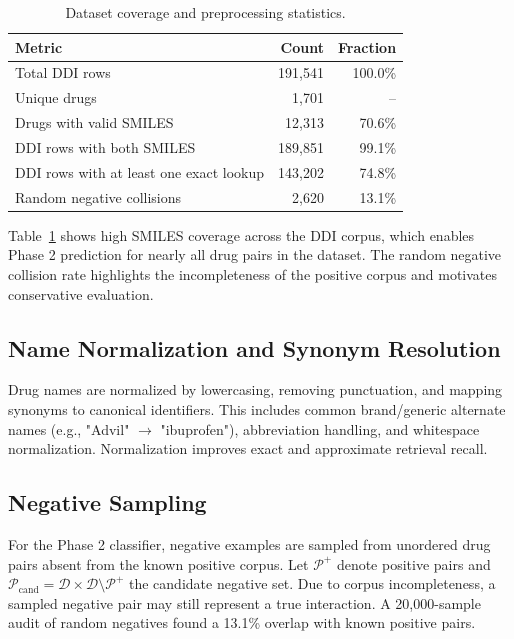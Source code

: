 \documentclass[conference]{IEEEtran}
\begin{document}
\begin{table}[t]
    \centering
    \caption{Dataset coverage and preprocessing statistics.}
    \label{tab:coverage}
    \begin{tabular}{@{}lrr@{}}
    \toprule
    Metric & Count & Fraction \\
    \midrule
    Total DDI rows & 191,541 & 100.0\% \\
    Unique drugs & 1,701 & -- \\
    Drugs with valid SMILES & 12,313 & 70.6\% \\
    DDI rows with both SMILES & 189,851 & 99.1\% \\
    DDI rows with at least one exact lookup & 143,202 & 74.8\% \\
    Random negative collisions & 2,620 & 13.1\% \\
    \bottomrule
    \end{tabular}
\end{table}

Table~\ref{tab:coverage} shows high SMILES coverage across the DDI corpus, which enables Phase 2 prediction for nearly all drug pairs in the dataset. The random negative collision rate highlights the incompleteness of the positive corpus and motivates conservative evaluation.

\subsection{Name Normalization and Synonym Resolution}
Drug names are normalized by lowercasing, removing punctuation, and mapping synonyms to canonical identifiers. This includes common brand/generic alternate names (e.g., "Advil" $\to$ "ibuprofen"), abbreviation handling, and whitespace normalization. Normalization improves exact and approximate retrieval recall.

\subsection{Negative Sampling}
For the Phase 2 classifier, negative examples are sampled from unordered drug pairs absent from the known positive corpus. Let $\mathcal{P}^+$ denote positive pairs and $\mathcal{P}_{\text{cand}} = \mathcal{D} \times \mathcal{D} \setminus \mathcal{P}^+$ the candidate negative set. Due to corpus incompleteness, a sampled negative pair may still represent a true interaction. A 20,000-sample audit of random negatives found a 13.1\% overlap with known positive pairs.
\end{document}
